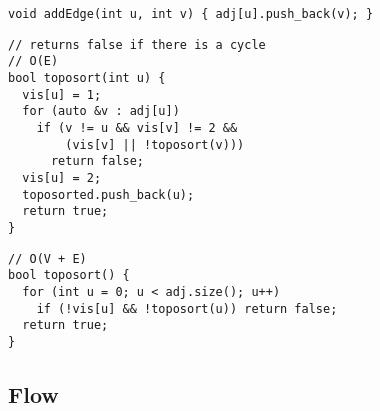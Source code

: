 \documentclass[twoside]{article}
\newcommand{\fileTitleStyle}{\raggedleft\underline}
\begin{document}
\begin{multicols*}{2}
\begin{verbatim}
void addEdge(int u, int v) { adj[u].push_back(v); }
\end{verbatim}
\vspace{-12pt}
\begin{verbatim}
// returns false if there is a cycle
// O(E)
bool toposort(int u) {
  vis[u] = 1;
  for (auto &v : adj[u])
    if (v != u && vis[v] != 2 &&
        (vis[v] || !toposort(v)))
      return false;
  vis[u] = 2;
  toposorted.push_back(u);
  return true;
}
\end{verbatim}
\vspace{-12pt}
\begin{verbatim}
// O(V + E)
bool toposort() {
  for (int u = 0; u < adj.size(); u++)
    if (!vis[u] && !toposort(u)) return false;
  return true;
}
\end{verbatim}

\vspace{0em}
\subsection*{Flow}
\vspace{2em}
\subsubsectionfont{\fileTitleStyle}

\end{multicols*}
\end{document}
